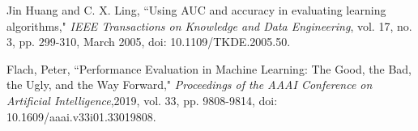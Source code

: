 \documentclass[conference]{IEEEtran}
\begin{document}
\begin{thebibliography}{00}
Jin Huang and C. X. Ling, “Using AUC and accuracy in evaluating learning algorithms," \textit{IEEE Transactions on Knowledge and Data Engineering}, vol. 17, no. 3, pp. 299-310, March 2005, doi: 10.1109/TKDE.2005.50.

Flach, Peter, “Performance Evaluation in Machine Learning: The Good, the Bad, the Ugly, and the Way Forward,"\textit{ Proceedings of the AAAI Conference on Artificial Intelligence},2019, vol. 33, pp. 9808-9814, doi: 10.1609/aaai.v33i01.33019808. 


\end{thebibliography}
\end{document}
